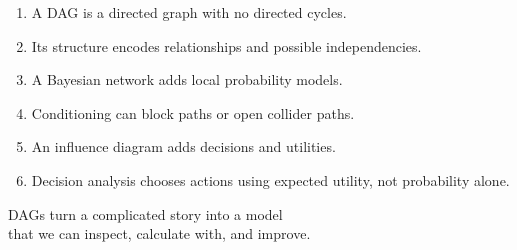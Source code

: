 \documentclass[aspectratio=43,11pt]{beamer}
\begin{document}
\begin{frame}{}

\begin{enumerate}
  \item A DAG is a directed graph with no directed cycles.
  \item Its structure encodes relationships and possible independencies.
  \item A Bayesian network adds local probability models.
  \item Conditioning can block paths or open collider paths.
  \item An influence diagram adds decisions and utilities.
  \item Decision analysis chooses actions using expected utility, not
        probability alone.
\end{enumerate}

\bigskip

\begin{center}
DAGs turn a complicated story into a model\\
that we can inspect, calculate with, and improve.
\end{center}

\end{frame}

%
%
%
%

\end{document}
